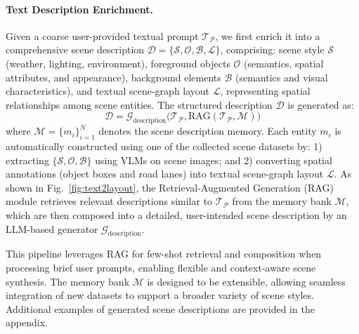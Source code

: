 \paragraph{Text Description Enrichment.}
Given a coarse user-provided textual prompt $\mathcal{T}_\mathcal{P}$, we first enrich it into a comprehensive scene description $\mathcal{D} = \{\mathcal{S}, \mathcal{O}, \mathcal{B}, \mathcal{L}\}$, comprising: scene style $\mathcal{S}$ (weather, lighting, environment), foreground objects $\mathcal{O}$ (semantics, spatial attributes, and appearance), background elements $\mathcal{B}$ (semantics and visual characteristics), and textual scene-graph layout $\mathcal{L}$, representing spatial relationships among scene entities.
The structured description $\mathcal{D}$ is generated as:
\begin{equation}
    \mathcal{D} = \mathcal{G}_\text{description}\big(\mathcal{T}_\mathcal{P}, \mathrm{RAG}(\mathcal{T}_\mathcal{P}, \mathcal{M})\big)
\end{equation}
where $\mathcal{M} = \{m_i\}_{i=1}^{N}$ denotes the scene description memory. Each entity $m_i$ is automatically constructed using one of the collected scene datasets by: 
1) extracting $\{\mathcal{S}, \mathcal{O}, \mathcal{B}\}$ using VLMs on scene images; and 
2) converting spatial annotations (object boxes and road lanes) into textual scene-graph layout $\mathcal{L}$. 
As shown in Fig.~\ref{fig:text2layout}, the Retrieval-Augmented Generation (RAG) module retrieves relevant descriptions similar to $\mathcal{T}_\mathcal{P}$ from the memory bank $\mathcal{M}$, which are then composed into a detailed, user-intended scene description by an LLM-based generator $\mathcal{G}_{\text{description}}$.

This pipeline leverages RAG for few-shot retrieval and composition when processing brief user prompts, enabling flexible and context-aware scene synthesis. The memory bank $\mathcal{M}$ is designed to be extensible, allowing seamless integration of new datasets to support a broader variety of scene styles. Additional examples of generated scene descriptions are provided in the appendix.

